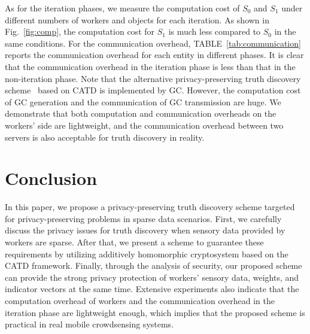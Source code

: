 \documentclass[conference]{IEEEtran}
\begin{document}
As for the iteration phases, we measure the computation cost of $S_0$ and $S_1$ under different numbers of workers and objects for each iteration.
As shown in Fig.~\ref{fig:comp}, the computation cost for $S_1$ is much less compared to $S_0$ in the same conditions.
For the communication overhead, TABLE~\ref{tab:communication} reports the communication overhead for each entity in different phases.
It is clear that the communication overhead in the iteration phase is less than that in the non-iteration phase.
Note that the alternative privacy-preserving truth discovery scheme~\cite{zheng_learning_2018} based on CATD is implemented by GC.
However, the computation cost of GC generation and the communication of GC transmission are huge.
We demonstrate that both computation and communication overheads on the workers' side are lightweight, and the communication overhead between two servers is also acceptable for truth discovery in reality.

\section{Conclusion}\label{sec8}
In this paper, we propose a privacy-preserving truth discovery scheme targeted for privacy-preserving problems in sparse data scenarios.
First, we carefully discuss the privacy issues for truth discovery when sensory data provided by workers are sparse.
After that, we present a scheme to guarantee these requirements by utilizing additively homomorphic cryptosystem based on the CATD framework.
Finally, through the analysis of security, our proposed scheme can provide the strong privacy protection of workers' sensory data, weights, and indicator vectors at the same time.
Extensive experiments also indicate that the computation overhead of workers and the communication overhead in the iteration phase are lightweight enough, which implies that the proposed scheme is practical in real mobile crowdsensing systems.
 




\vspace{12pt}
\end{document}
